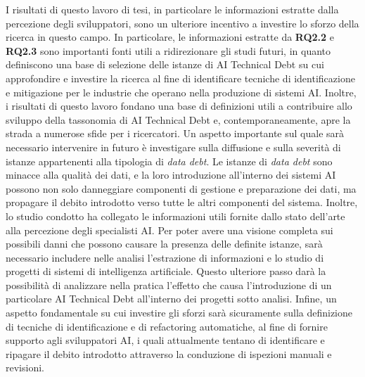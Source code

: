 I risultati di questo lavoro di tesi, in particolare le informazioni estratte dalla percezione degli sviluppatori, sono un ulteriore incentivo a investire lo sforzo della ricerca in questo campo. 
In particolare, le informazioni estratte da \textbf{RQ2.2} e \textbf{RQ2.3} sono importanti fonti utili a ridirezionare gli studi futuri, in quanto definiscono una base di selezione delle istanze di AI Technical Debt su cui approfondire e investire la ricerca al fine di identificare tecniche di identificazione e mitigazione per le industrie che operano nella produzione di sistemi AI.
Inoltre, i risultati di questo lavoro fondano una base di definizioni utili a contribuire allo sviluppo della tassonomia di AI Technical Debt e, contemporaneamente, apre la strada a numerose sfide per i ricercatori.
Un aspetto importante sul quale sarà necessario intervenire in futuro è investigare sulla diffusione e sulla severità di istanze appartenenti alla tipologia di \textit{data debt}.
Le istanze di \textit{data debt} sono minacce alla qualità dei dati, e la loro introduzione all'interno dei sistemi AI possono non solo danneggiare componenti di gestione e preparazione dei dati, ma propagare il debito introdotto verso tutte le altri componenti del sistema.
Inoltre, lo studio condotto ha collegato le informazioni utili fornite dallo stato dell'arte alla percezione degli specialisti AI. 
Per poter avere una visione completa sui possibili danni che possono causare la presenza delle definite istanze, sarà necessario includere nelle analisi l'estrazione di informazioni e lo studio di progetti di sistemi di intelligenza artificiale.
Questo ulteriore passo darà la possibilità di analizzare nella pratica l'effetto che causa l'introduzione di un particolare AI Technical Debt all'interno dei progetti sotto analisi.
Infine, un aspetto fondamentale su cui investire gli sforzi sarà sicuramente sulla definizione di tecniche di identificazione e di refactoring automatiche, al fine di fornire supporto agli sviluppatori AI, i quali attualmente tentano di identificare e ripagare il debito introdotto attraverso la conduzione di ispezioni manuali e revisioni.